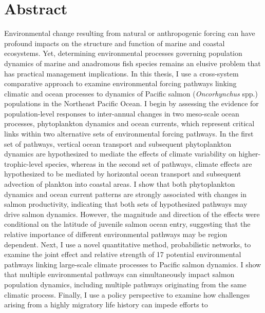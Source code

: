 %
%
%


\chapter*{Abstract}

Environmental change resulting from natural or anthropogenic forcing can have
profound impacts on the structure and function of marine and coastal ecosystems.
Yet, determining environmental processes governing population dynamics of marine
and anadromous fish species remains an elusive problem that has practical
management implications. In this thesis, I use a cross-system comparative
approach to examine environmental forcing pathways linking climatic and ocean
processes to dynamics of Pacific salmon (\textit{Oncorhynchus} spp.) populations
in the Northeast Pacific Ocean. I begin by assessing the evidence for
population-level responses to inter-annual changes in two meso-scale ocean
processes, phytoplankton dynamics and ocean currents, which represent critical
links within two alternative sets of environmental forcing pathways. In the
first set of pathways, vertical ocean transport and subsequent phytoplankton
dynamics are hypothesized to mediate the effects of climate variability on
higher-trophic-level species, whereas in the second set of pathways, climate
effects are hypothesized to be mediated by horizontal ocean transport and
subsequent advection of plankton into coastal areas. I show that both
phytoplankton dynamics and ocean current patterns are strongly associated with
changes in salmon productivity, indicating that both sets of hypothesized
pathways may drive salmon dynamics. However, the magnitude and direction of the
effects were conditional on the latitude of juvenile salmon ocean entry,
suggesting that the relative importance of different environmental pathways may
be region dependent. Next, I use a novel quantitative method, probabilistic
networks, to examine the joint effect and relative strength of 17 potential
environmental pathways linking large-scale climate processes to Pacific salmon
dynamics. I show that multiple environmental pathways can simultaneously impact
salmon population dynamics, including multiple pathways originating from the
same climatic process. Finally, I use a policy perspective to examine how
challenges arising from a highly migratory life history can impede efforts to
